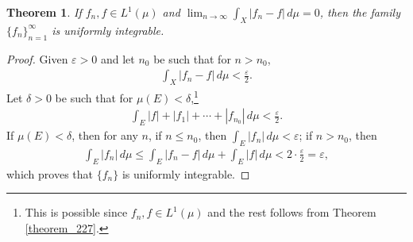 \documentclass[11pt]{book}
\newtheorem{theorem}{Theorem}[chapter]
\theoremstyle{definition}
\numberwithin{equation}{chapter}
\begin{document}
\medskip

\begin{theorem}\label{theorem_228}
If $f_n, f \in L^1(\mu)$ and $\lim_{n\to\infty}\int_X \left|f_n - f\right|\,d\mu = 0$, then the family $\{f_n\}^\infty_{n=1}$ is uniformly integrable.
\end{theorem}
\begin{proof}
Given $\varepsilon > 0$ and let $n_0$ be such that for $n > n_0$,
\begin{align*}
    \int_X \left|f_n - f\right|\,d\mu < \frac{\varepsilon}{2}.
\end{align*}
Let $\delta > 0$ be such that for $\mu(E) < \delta$,\footnote{This is possible since $f_n,f \in L^1(\mu)$ and the rest follows from Theorem \ref{theorem_227}.}
\begin{align*}
    \int_E \left|f\right| + \left|f_1\right| + \cdots + \left|f_{n_0}\right|\,d\mu < \frac{\varepsilon}{2}.
\end{align*}
If $\mu(E) < \delta$, then for any $n$, if $n \leq n_0$, then $\int_E \left|f_n\right|\,d\mu < \varepsilon$; if $n > n_0$, then
\begin{align*}
    \int_E \left|f_n\right|\,d\mu \leq \int_E \left|f_n - f\right|\,d\mu + \int_E \left|f\right|\,d\mu < 2 \cdot \frac{\varepsilon}{2} = \varepsilon,
\end{align*}
which proves that $\{f_n\}$ is uniformly integrable.
\end{proof}

\medskip
\end{document}
